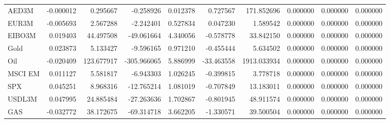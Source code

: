 \documentclass[12pt]{article}
\begin{document}
\begin{sloppypar}
\begin{table}[h]
{\begin{tabular}{lrrrrrrrrr}
        AED3M & -0.000012 & 0.295667 & -0.258926 & 0.012378 & 0.727567 & 171.852696 & 0.000000 & 0.000000 & 0.000000 \\
        EUR3M & -0.005693 & 2.567288 & -2.242401 & 0.527834 & 0.047230 & 1.589542 & 0.000000 & 0.000000 & 0.000000 \\
        EIBO3M & 0.019403 & 44.497508 & -49.061664 & 4.340056 & -0.578778 & 33.842150 & 0.000000 & 0.000000 & 0.000000 \\
        Gold & 0.023873 & 5.133427 & -9.596165 & 0.971210 & -0.455444 & 5.634502 & 0.000000 & 0.000000 & 0.000000 \\
        Oil & -0.020409 & 123.677917 & -305.966065 & 5.886999 & -33.463558 & 1913.033934 & 0.000000 & 0.000000 & 0.000000 \\
        MSCI EM & 0.011127 & 5.581817 & -6.943303 & 1.026245 & -0.399815 & 3.778718 & 0.000000 & 0.000000 & 0.000000 \\
        SPX & 0.045251 & 8.968316 & -12.765214 & 1.081019 & -0.707849 & 13.183011 & 0.000000 & 0.000000 & 0.000000 \\
        USDL3M & 0.047995 & 24.885484 & -27.263636 & 1.702867 & -0.801945 & 48.911574 & 0.000000 & 0.000000 & 0.000000 \\
        GAS & -0.032772 & 38.172675 & -69.314718 & 3.662205 & -1.330571 & 39.500504 & 0.000000 & 0.000000 & 0.000000 \\
        \hline
    \end{tabular}}%
\end{table}


\end{sloppypar}
\end{document}
